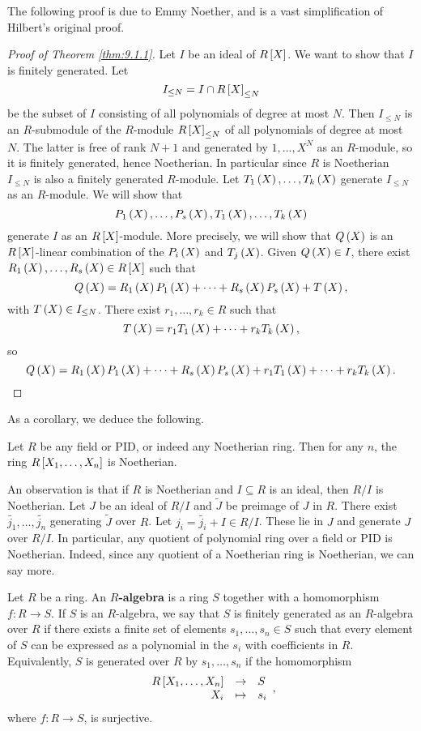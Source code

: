 The following proof is due to Emmy Noether, and is a vast simplification of Hilbert's original proof.

\begin{proof}[Proof of Theorem \ref{thm:9.1.1}]
Let $ I $ be an ideal of $ R\sb{X} $. We want to show that $ I $ is finitely generated. Let
$$ I_{\le N} = I \cap R\sb{X}_{\le N} $$
be the subset of $ I $ consisting of all polynomials of degree at most $ N $. Then $ I_{\le N} $ is an $ R $-submodule of the $ R $-module $ R\sb{X}_{\le N} $ of all polynomials of degree at most $ N $. The latter is free of rank $ N + 1 $ and generated by $ 1, \dots, X^N $ as an $ R $-module, so it is finitely generated, hence Noetherian. In particular since $ R $ is Noetherian $ I_{\le N} $ is also a finitely generated $ R $-module. Let $ T_1\rb{X}, \dots, T_k\rb{X} $ generate $ I_{\le N} $ as an $ R $-module. We will show that
$$ P_1\rb{X}, \dots, P_s\rb{X}, T_1\rb{X}, \dots, T_k\rb{X} $$
generate $ I $ as an $ R\sb{X} $-module. More precisely, we will show that $ Q\rb{X} $ is an $ R\sb{X} $-linear combination of the $ P_i\rb{X} $ and $ T_j\rb{X} $. Given $ Q\rb{X} \in I $, there exist $ R_1\rb{X}, \dots, R_s\rb{X} \in R\sb{X} $ such that
$$ Q\rb{X} = R_1\rb{X}P_1\rb{X} + \dots + R_s\rb{X}P_s\rb{X} + T\rb{X}, $$
with $ T\rb{X} \in I_{\le N} $. There exist $ r_1, \dots, r_k \in R $ such that
$$ T\rb{X} = r_1T_1\rb{X} + \dots + r_kT_k\rb{X}, $$
so
$$ Q\rb{X} = R_1\rb{X}P_1\rb{X} + \dots + R_s\rb{X}P_s\rb{X} + r_1T_1\rb{X} + \dots + r_kT_k\rb{X}. $$
\end{proof}

As a corollary, we deduce the following.

\begin{corollary}
Let $ R $ be any field or PID, or indeed any Noetherian ring. Then for any $ n $, the ring $ R\sb{X_1, \dots, X_n} $ is Noetherian.
\end{corollary}

An observation is that if $ R $ is Noetherian and $ I \subseteq R $ is an ideal, then $ R / I $ is Noetherian. Let $ J $ be an ideal of $ R / I $ and $ \widetilde{J} $ be preimage of $ J $ in $ R $. There exist $ \widetilde{j_1}, \dots, \widetilde{j_n} $ generating $ \widetilde{J} $ over $ R $. Let $ j_i = \widetilde{j_i} + I \in R / I $. These lie in $ J $ and generate $ J $ over $ R / I $. In particular, any quotient of polynomial ring over a field or PID is Noetherian. Indeed, since any quotient of a Noetherian ring is Noetherian, we can say more.

\begin{definition}
Let $ R $ be a ring. An \textbf{$ R $-algebra} is a ring $ S $ together with a homomorphism $ f : R \to S $. If $ S $ is an $ R $-algebra, we say that $ S $ is finitely generated as an $ R $-algebra over $ R $ if there exists a finite set of elements $ s_1, \dots, s_n \in S $ such that every element of $ S $ can be expressed as a polynomial in the $ s_i $ with coefficients in $ R $. Equivalently, $ S $ is generated over $ R $ by $ s_1, \dots, s_n $ if the homomorphism
$$ \function{R\sb{X_1, \dots, X_n}}{S}{X_i}{s_i}, $$
where $ f : R \to S $, is surjective.
\end{definition}

